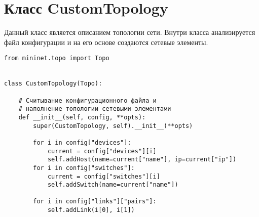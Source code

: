\chapter{Класс CustomTopology}

Данный класс является описанием топологии сети. Внутри класса
анализируется файл конфигурации и на его основе создаются сетевые
элементы.

\begin{verbatim}
from mininet.topo import Topo


class CustomTopology(Topo):
    
    # Считывание конфигурационного файла и 
    # наполнение топологии сетевыми элементами
    def __init__(self, config, **opts):
        super(CustomTopology, self).__init__(**opts)

        for i in config["devices"]:
            current = config["devices"][i]
            self.addHost(name=current["name"], ip=current["ip"])
        for i in config["switches"]:
            current = config["switches"][i]
            self.addSwitch(name=current["name"])

        for i in config["links"]["pairs"]:
            self.addLink(i[0], i[1])

\end{verbatim}
